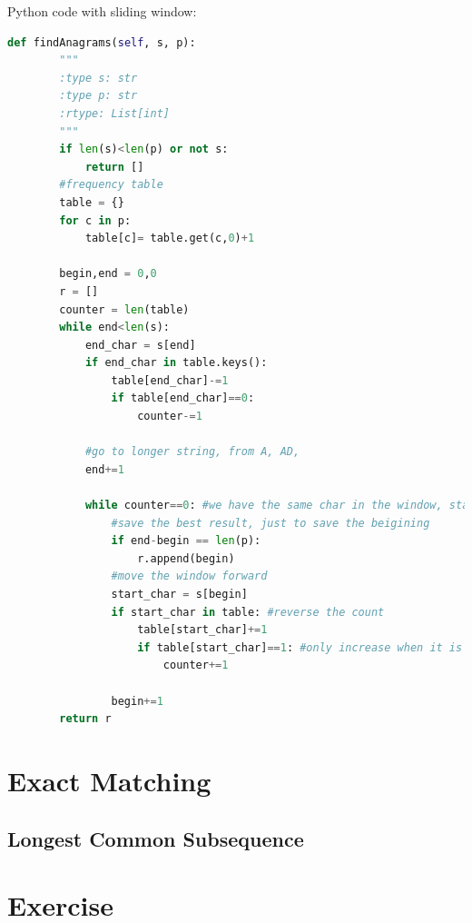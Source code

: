 \documentclass[../main.tex]{subfiles}
\begin{document}
Python code with sliding window:
\begin{lstlisting}[language = Python]
def findAnagrams(self, s, p):
        """
        :type s: str
        :type p: str
        :rtype: List[int]
        """
        if len(s)<len(p) or not s:
            return []
        #frequency table
        table = {}
        for c in p:
            table[c]= table.get(c,0)+1
      
        begin,end = 0,0
        r = []
        counter = len(table)
        while end<len(s):
            end_char = s[end]
            if end_char in table.keys():
                table[end_char]-=1
                if table[end_char]==0:
                    counter-=1
            
            #go to longer string, from A, AD, 
            end+=1
            
            while counter==0: #we have the same char in the window, start to trim it
                #save the best result, just to save the beigining
                if end-begin == len(p):
                    r.append(begin)
                #move the window forward
                start_char = s[begin]
                if start_char in table: #reverse the count
                    table[start_char]+=1
                    if table[start_char]==1: #only increase when it is 1
                        counter+=1
                        
                begin+=1
        return r
\end{lstlisting}

\section{Exact Matching}
\label{string_exact_matching}
\subsection{Longest Common Subsequence}



\section{Exercise}
\end{document}
